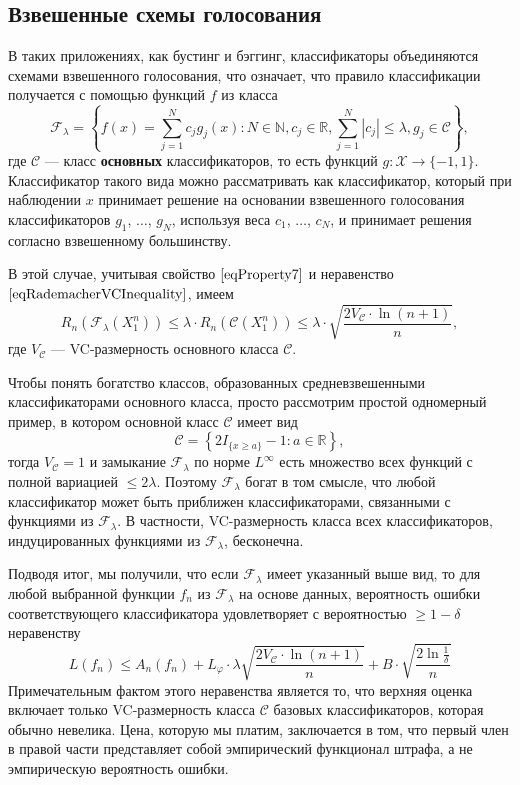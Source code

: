 \documentclass[12pt]{article}
\begin{document}
\subsection{Взвешенные схемы голосования}
В таких приложениях, как бустинг и бэггинг, классификаторы объединяются схемами взвешенного голосования, что означает, что правило классификации получается с помощью функций $f$ из класса
\begin{equation}\label{eqWeightedClasses}
	\mathcal{F}_\lambda=\left\{f(x)=\sum\limits_{j=1}^{N}c_jg_j(x): N\in\mathbb{N}, c_j\in\mathbb{R}, \sum\limits_{j=1}^{N}|c_j|\leqslant\lambda, g_j\in\mathcal{C}\right\},
\end{equation}
где $\mathcal{C}$ --- класс \textbf{основных} классификаторов, то есть функций $g:\mathcal{X}\to\{-1,1\}$. Классификатор такого вида можно рассматривать как классификатор, который при наблюдении $x$ принимает решение на основании взвешенного голосования классификаторов $g_1$, $\dots$, $g_N$, используя
веса $c_1$, $\dots$, $c_N$, и принимает решения согласно взвешенному большинству.

В этой случае, учитывая свойство $\eqref{eqProperty7}$ и неравенство $\eqref{eqRademacherVCInequality}$, имеем
\begin{equation*}
	R_n(\mathcal{F}_\lambda(X_1^n))\leqslant\lambda\cdot R_n(\mathcal{C}(X_1^n))\leqslant\lambda\cdot\sqrt{\frac{2V_\mathcal{C}\cdot\ln(n+1)}{n}},
\end{equation*}
где $V_\mathcal{C}$ --- VC-размерность основного класса $\mathcal{C}$.

Чтобы понять богатство классов, образованных средневзвешенными классификаторами основного класса, просто рассмотрим простой одномерный пример, в котором основной класс $\mathcal{C}$ имеет вид
\begin{equation*}
	\mathcal{C}=\left\{2I_{\{x\geqslant a\}}-1: a\in\mathbb{R}\right\},
\end{equation*}
тогда $V_\mathcal{C}=1$ и замыкание $\mathcal{F}_\lambda$ по норме $L^\infty$ есть множество всех функций с полной вариацией $\leqslant2\lambda$. Поэтому $\mathcal{F}_\lambda$ богат в том смысле, что любой классификатор может быть приближен классификаторами, связанными с функциями из $\mathcal{F}_\lambda$. В частности, VC-размерность класса всех классификаторов, индуцированных функциями из $\mathcal{F}_\lambda$, бесконечна.

Подводя итог, мы получили, что если $\mathcal{F}_\lambda$ имеет указанный выше вид, то для любой выбранной функции $f_n$
из $\mathcal{F}_\lambda$ на основе данных, вероятность ошибки соответствующего классификатора удовлетворяет с вероятностью $\geqslant1-\delta$ неравенству
\begin{equation*}
	L(f_n)\leqslant A_n(f_n)+L_\varphi\cdot\lambda\sqrt{\frac{2V_\mathcal{C}\cdot\ln(n+1)}{n}}+B\cdot\sqrt{\frac{2\ln\frac{1}{\delta}}{n}}
\end{equation*}
Примечательным фактом этого неравенства является то, что верхняя оценка включает только VC-размерность класса $\mathcal{C}$ базовых классификаторов, которая обычно невелика. Цена, которую мы платим, заключается в том, что первый член в правой части представляет собой эмпирический функционал штрафа, а не эмпирическую вероятность ошибки.
\end{document}
